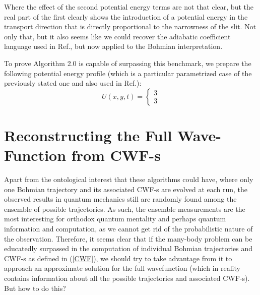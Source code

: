 \documentclass[11pt, a4paper]{article} %
\begin{document}

Where the effect of the second potential energy terms are not that clear, but the real part of the first clearly shows the introduction of a potential energy in the transport direction that is directly proportional to the narrowness of the slit. Not only that, but it also seems like we could recover the adiabatic coefficient language used in Ref.\cite{Dev}, but now applied to the Bohmian interpretation.

To prove Algorithm 2.0 is capable of surpassing this benchmark, we prepare the following potential energy profile (which is a particular parametrized case of the previously stated one and also used in Ref.\cite{Dev}):
$$
U(x,y,t)=\begin{cases} 3\\3 \end{cases}
$$


\newpage
\section{Reconstructing the Full Wave-Function from CWF-s}
Apart from the ontological interest that these algorithms could have, where only one Bohmian trajectory and its associated CWF-s are evolved at each run, the observed results in quantum mechanics still are randomly found among the ensemble of possible trajectories. As such, the ensemble measurements are the most interesting for orthodox quantum mentality and perhaps quantum information and computation, as we cannot get rid of the probabilistic nature of the observation. Therefore, it seems clear that if the many-body problem can be educatedly surpassed in the computation of individual Bohmian trajectories and CWF-s as defined in (\ref{CWF}), we should try to take advantage from it to approach an approximate solution for the full wavefunction (which in reality contains information about all the possible trajectories and associated CWF-s). But how to do this?
\end{document}
